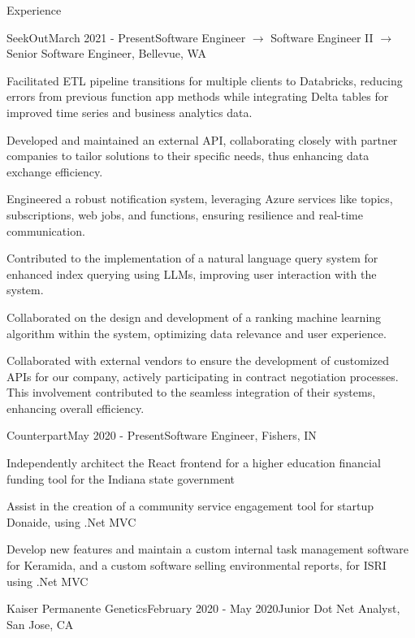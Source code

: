 \documentclass{resume} %
\begin{document}
\begin{rSection}{Experience}
    \begin{rSubsection}{SeekOut}{March 2021 - Present}{Software Engineer $\rightarrow$ Software Engineer 
 II $\rightarrow$ Senior Software Engineer, Bellevue, WA}

        \item Facilitated ETL pipeline transitions for multiple clients to Databricks, reducing errors from previous function app methods while integrating Delta tables for improved time series and business analytics data.
        \item Developed and maintained an external API, collaborating closely with partner companies to tailor solutions to their specific needs, thus enhancing data exchange efficiency.
        \item Engineered a robust notification system, leveraging Azure services like topics, subscriptions, web jobs, and functions, ensuring resilience and real-time communication.
        \item Contributed to the implementation of a natural language query system for enhanced index querying using LLMs, improving user interaction with the system.
        \item Collaborated on the design and development of a ranking machine learning algorithm within the system, optimizing data relevance and user experience.
        \item Collaborated with external vendors to ensure the development of customized APIs for our company, actively participating in contract negotiation processes. This involvement contributed to the seamless integration of their systems, enhancing overall efficiency.
        \end{rSubsection}
\begin{rSubsection}{Counterpart}{May 2020 - Present}{Software Engineer, Fishers, IN}

    \item Independently architect the React frontend for a higher education financial funding tool for the Indiana state government
    \item Assist in the creation of a community service engagement tool for startup Donaide, using .Net MVC
    \item Develop new features and maintain a custom internal task management software for Keramida, and a custom software selling environmental reports, for ISRI using .Net MVC
    \end{rSubsection}
\begin{rSubsection}{Kaiser Permanente Genetics}{February 2020 - May 2020}{Junior Dot Net Analyst, San Jose, CA}


\end{rSubsection}
\end{rSection}
\end{document}
